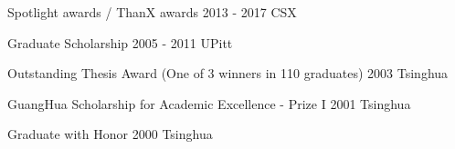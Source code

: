 
\begin{cvhonors}

\cvhonor
{Spotlight awards / ThanX awards} %
{} %
{2013 - 2017} %
{CSX} %

\cvhonor
{Graduate Scholarship} %
{} %
{2005 - 2011} %
{UPitt} %

\cvhonor
{Outstanding Thesis Award (One of 3 winners in 110 graduates)} %
{} %
{2003} %
{Tsinghua} %

\cvhonor
{GuangHua Scholarship for Academic Excellence - Prize I} %
{} %
{2001} %
{Tsinghua} %

\cvhonor
{Graduate with Honor} %
{} %
{2000} %
{Tsinghua} %

\end{cvhonors}




